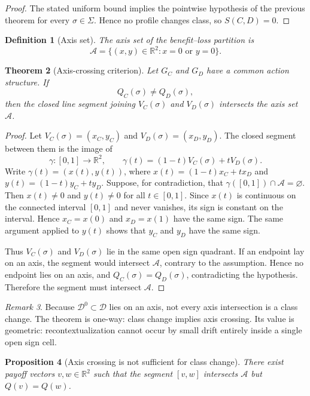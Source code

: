 \documentclass[a4paper,fleqn]{cas-dc}
\newtheorem{definition}{Definition}[section]
\newtheorem{theorem}[definition]{Theorem}
\newtheorem{proposition}[definition]{Proposition}
\theoremstyle{remark}
\newtheorem{remark}[definition]{Remark}
\newcommand{\R}{\mathbb{R}}
\newcommand{\Prof}{\Sigma}
\begin{document}
\begin{proof}
The stated uniform bound implies the pointwise hypothesis of the previous theorem for every $\sigma\in\Prof$. Hence no profile changes class, so $S(C,D)=0$.
\end{proof}

\begin{definition}[Axis set]
The axis set of the benefit--loss partition is
\[
\mathcal A=\{(x,y)\in\R^2:x=0\text{ or }y=0\}.
\]
\end{definition}


\begin{theorem}[Axis-crossing criterion]
\label{thm:axis-crossing}
Let $G_C$ and $G_D$ have a common action structure. If
\[
Q_C(\sigma)\ne Q_D(\sigma),
\]
then the closed line segment joining $V_C(\sigma)$ and $V_D(\sigma)$ intersects the axis set $\mathcal A$.
\end{theorem}

\begin{proof}
Let $V_C(\sigma)=(x_C,y_C)$ and $V_D(\sigma)=(x_D,y_D)$. The closed segment between them is the image of
\[
\gamma:[0,1]\to\R^2,\qquad \gamma(t)=(1-t)V_C(\sigma)+tV_D(\sigma).
\]
Write $\gamma(t)=(x(t),y(t))$, where $x(t)=(1-t)x_C+t x_D$ and $y(t)=(1-t)y_C+t y_D$. Suppose, for contradiction, that $\gamma([0,1])\cap\mathcal A=\varnothing$. Then $x(t)\ne 0$ and $y(t)\ne 0$ for all $t\in[0,1]$. Since $x(t)$ is continuous on the connected interval $[0,1]$ and never vanishes, its sign is constant on the interval. Hence $x_C=x(0)$ and $x_D=x(1)$ have the same sign. The same argument applied to $y(t)$ shows that $y_C$ and $y_D$ have the same sign.

Thus $V_C(\sigma)$ and $V_D(\sigma)$ lie in the same open sign quadrant. If an endpoint lay on an axis, the segment would intersect $\mathcal A$, contrary to the assumption. Hence no endpoint lies on an axis, and $Q_C(\sigma)=Q_D(\sigma)$, contradicting the hypothesis. Therefore the segment must intersect $\mathcal A$.
\end{proof}

\begin{remark}
Because $\mathcal D^0\subset\mathcal D$ lies on an axis, not every axis intersection is a class change. The theorem is one-way: class change implies axis crossing. Its value is geometric: recontextualization cannot occur by small drift entirely inside a single open sign cell.
\end{remark}

\begin{proposition}[Axis crossing is not sufficient for class change]
There exist payoff vectors $v,w\in\R^2$ such that the segment $[v,w]$ intersects $\mathcal A$ but $Q(v)=Q(w)$.
\end{proposition}
\end{document}
